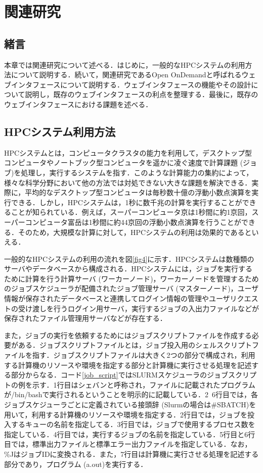 
\section{関連研究}

\subsection{緒言}
本章では関連研究について述べる．はじめに，一般的なHPCシステムの利用方法について説明する．続いて，関連研究であるOpen OnDemandと呼ばれるウェブインタフェースについて説明する．ウェブインタフェースの機能やその設計について説明し，既存のウェブインタフェースの利点を整理する．最後に，既存のウェブインタフェースにおける課題を述べる．

\subsection{HPCシステム利用方法}
HPCシステムとは，コンピュータクラスタの能力を利用して，デスクトップ型コンピュータやノートブック型コンピュータを遥かに凌ぐ速度で計算課題 (ジョブ)を処理し，実行するシステムを指す．このような計算能力の集約によって，様々な科学分野において他の方法では対処できない大きな課題を解決できる．実際に，平均的なデスクトップ型コンピュータは毎秒数十億の浮動小数点演算を実行できる．しかし，HPCシステムは，1秒に数千兆の計算を実行することができることが知られている．例えば，スーパーコンピュータ京は1秒間に約1京回，スーパーコンピュータ富岳は1秒間に約44京回の浮動小数点演算を行うことができる\cite{kei,hugaku}．そのため，大規模な計算に対して，HPCシステムの利用は効果的であるといえる．\par
一般的なHPCシステムの利用の流れを図\ref{fig4}に示す．HPCシステムは数種類のサーバやデータベースから構成される．HPCシステムには，ジョブを実行するために計算を行う計算サーバ (ワーカーノード)，ワーカーノードを管理するためのジョブスケジューラが配備されたジョブ管理サーバ (マスターノード)，ユーザ情報が保存されたデータベースと連携してログイン情報の管理やユーザリクエストの受け渡しを行うログイン用サーバ，実行するジョブの入出力ファイルなどが保存されたファイル管理用サーバなどが存在する．\par
また，ジョブの実行を依頼するためにはジョブスクリプトファイルを作成する必要がある．ジョブスクリプトファイルとは，ジョブ投入用のシェルスクリプトファイルを指す．ジョブスクリプトファイルは大きく2つの部分で構成され，利用する計算機のリソースや環境を指定する部分と計算機に実行させる処理を記述する部分からなる．コード\ref{job_script}ではSLURMスケジューラのジョブスクリプトの例を示す．1行目はシェバンと呼称され，ファイルに記載されたプログラムが/bin/bashで実行されるということを明示的に記載している．2~6行目では，各ジョブスケジューラごとに定義されている接頭辞 (Slurmの場合は\#SBATCH)を用いて，利用する計算機のリソースや環境を指定する．2行目では，ジョブを投入するキューの名前を指定してる．3行目では，ジョブで使用するプロセス数を指定している．4行目では，実行するジョブの名前を指定している．5行目と6行目では，標準出力ファイルと標準エラー出力ファイルを指定している．なお，\%JはジョブIDに変換される．また，7行目は計算機に実行させる処理を記述する部分であり，プログラム (a.out)を実行する．\par
